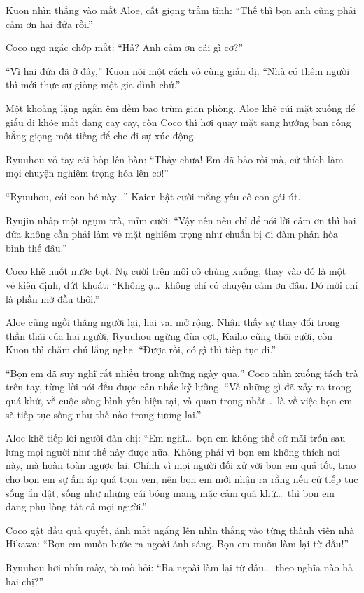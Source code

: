 ﻿\documentclass[../main.tex]{subfiles}
\begin{document}
Kuon nhìn thẳng vào mắt Aloe, cất giọng trầm tĩnh: ``Thế thì bọn anh cũng phải cảm ơn hai đứa rồi.''

Coco ngơ ngác chớp mắt: ``Hả? Anh cảm ơn cái gì cơ?''

``Vì hai đứa đã ở đây,'' Kuon nói một cách vô cùng giản dị. ``Nhà có thêm người thì mới thực sự giống một gia đình chứ.''

Một khoảng lặng ngắn êm đềm bao trùm gian phòng. Aloe khẽ cúi mặt xuống để giấu đi khóe mắt đang cay cay, còn Coco thì hơi quay mặt sang hướng ban công hắng giọng một tiếng để che đi sự xúc động.

Ryuuhou vỗ tay cái bốp lên bàn: ``Thấy chưa! Em đã bảo rồi mà, cứ thích làm mọi chuyện nghiêm trọng hóa lên cơ!''

``Ryuuhou, cái con bé này\dots'' Kaien bật cười mắng yêu cô con gái út.

Ryujin nhấp một ngụm trà, mỉm cười: ``Vậy nên nếu chỉ để nói lời cảm ơn thì hai đứa không cần phải làm vẻ mặt nghiêm trọng như chuẩn bị đi đàm phán hòa bình thế đâu.''

Coco khẽ nuốt nước bọt. Nụ cười trên môi cô chùng xuống, thay vào đó là một vẻ kiên định, dứt khoát: ``Không ạ\dots\ không chỉ có chuyện cảm ơn đâu. Đó mới chỉ là phần mở đầu thôi.''

Aloe cũng ngồi thẳng người lại, hai vai mở rộng. Nhận thấy sự thay đổi trong thần thái của hai người, Ryuuhou ngừng đùa cợt, Kaiho cũng thôi cười, còn Kuon thì chăm chú lắng nghe. ``Được rồi, có gì thì tiếp tục đi.''

``Bọn em đã suy nghĩ rất nhiều trong những ngày qua,'' Coco nhìn xuống tách trà trên tay, từng lời nói đều được cân nhắc kỹ lưỡng. ``Về những gì đã xảy ra trong quá khứ, về cuộc sống bình yên hiện tại, và quan trọng nhất\dots\ là về việc bọn em sẽ tiếp tục sống như thế nào trong tương lai.''

Aloe khẽ tiếp lời người đàn chị: ``Em nghĩ\dots\ bọn em không thể cứ mãi trốn sau lưng mọi người như thế này được nữa. Không phải vì bọn em không thích nơi này, mà hoàn toàn ngược lại. Chính vì mọi người đối xử với bọn em quá tốt, trao cho bọn em sự ấm áp quá trọn vẹn, nên bọn em mới nhận ra rằng nếu cứ tiếp tục sống ẩn dật, sống như những cái bóng mang mặc cảm quá khứ\dots\ thì bọn em đang phụ lòng tất cả mọi người.''

Coco gật đầu quả quyết, ánh mắt ngẩng lên nhìn thẳng vào từng thành viên nhà Hikawa: ``Bọn em muốn bước ra ngoài ánh sáng. Bọn em muốn làm lại từ đầu!''

Ryuuhou hơi nhíu mày, tò mò hỏi: ``Ra ngoài làm lại từ đầu\dots\ theo nghĩa nào hả hai chị?''
\end{document}
